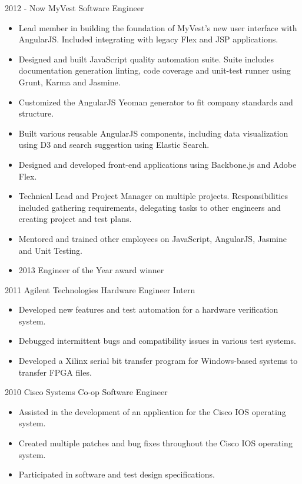 \documentclass[]{friggeri-cv}
\begin{document}
\begin{entrylist}
  \entry
    {2012 - Now}
    {MyVest}
    {Software Engineer}
    {\begin{itemize}
    \item Lead member in building the foundation of MyVest’s new user interface with AngularJS. Included integrating with legacy Flex and JSP applications.
    \item Designed and built JavaScript quality automation suite. Suite includes documentation generation linting, code coverage and unit-test runner using Grunt, Karma and Jasmine.
    \item Customized the AngularJS Yeoman generator to fit company standards and structure.
    \item Built various reusable AngularJS components, including data visualization using D3 and search suggestion using Elastic Search.
    \item Designed and developed front-end applications using Backbone.js and Adobe Flex.
    \item Technical Lead and Project Manager on multiple projects. Responsibilities included gathering requirements, delegating tasks to other engineers and creating project and test plans.
    \item Mentored and trained other employees on JavaScript, AngularJS, Jasmine and Unit Testing.
    \item 2013 Engineer of the Year award winner
    \end{itemize}
    }
  \entry
    {2011}
    {Agilent Technologies}
    {Hardware Engineer Intern}
    {\begin{itemize}
    \item Developed new features and test automation for a hardware verification system.
    \item Debugged intermittent bugs and compatibility issues in various test systems.
    \item Developed a Xilinx serial bit transfer program for Windows-based systems to transfer FPGA files.
    \end{itemize}
    }
  \entry
    {2010}
    {Cisco Systems}
    {Co-op Software Engineer}
    {\begin{itemize}
    \item Assisted in the development of an application for the Cisco IOS operating system.
    \item Created multiple patches and bug fixes throughout the Cisco IOS operating system.
    \item Participated in software and test design specifications.
    \end{itemize}
    }
\end{entrylist}
\end{document}
